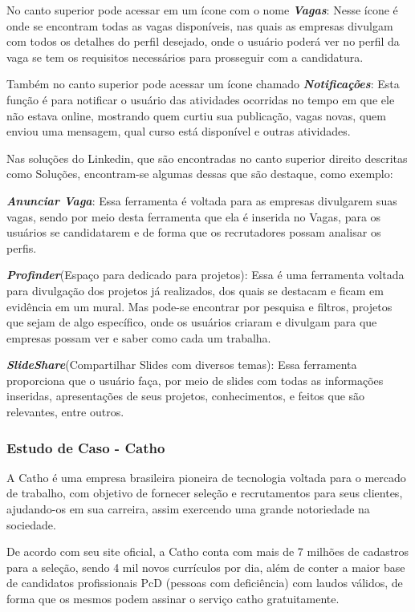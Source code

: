 No canto superior pode acessar em um ícone com o nome \textbf{\emph{Vagas}}: Nesse ícone é onde se encontram todas as vagas disponíveis, nas quais as empresas divulgam com todos os detalhes do perfil desejado, onde o usuário poderá ver no perfil da vaga se tem os requisitos necessários para prosseguir com a candidatura. 

Também no canto superior pode acessar um ícone chamado \textbf{\emph{Notificações}}: Esta função é para notificar o usuário das atividades ocorridas no tempo em que ele não estava online, mostrando quem curtiu sua publicação, vagas novas, quem enviou uma mensagem, qual curso está disponível e outras atividades.

Nas soluções do Linkedin, que são encontradas no canto superior direito descritas como Soluções, encontram-se algumas dessas que são destaque, como exemplo:

\textbf{\emph{Anunciar Vaga}}: Essa ferramenta é voltada para as empresas divulgarem suas vagas, sendo por meio desta ferramenta que ela é inserida no Vagas, para os usuários se candidatarem e de forma que os recrutadores possam analisar os perfis. 

\textbf{\emph{Profinder}}(Espaço para dedicado para projetos): Essa é uma ferramenta voltada para divulgação dos projetos já realizados, dos quais se destacam e ficam em evidência em um mural. Mas pode-se encontrar por pesquisa e filtros, projetos que sejam de algo específico, onde os usuários criaram e divulgam para que empresas possam ver e saber como cada um trabalha.

\textbf{\emph{SlideShare}}(Compartilhar Slides com diversos temas): Essa ferramenta proporciona que o usuário faça, por meio de slides com todas as informações inseridas, apresentações de seus projetos, conhecimentos, e feitos que são relevantes, entre outros.

\subsubsection{Estudo de Caso - Catho}

A Catho é uma empresa brasileira pioneira de tecnologia voltada para o mercado de trabalho, com objetivo de fornecer seleção e recrutamentos para seus clientes, ajudando-os em sua carreira, assim exercendo uma grande notoriedade na sociedade.

De acordo com seu site oficial, a Catho conta com mais de 7 milhões de cadastros para a seleção, sendo 4 mil novos currículos por dia, além de conter a maior base de candidatos profissionais PcD (pessoas com deficiência) com laudos válidos, de forma que os mesmos podem assinar o serviço catho gratuitamente.


